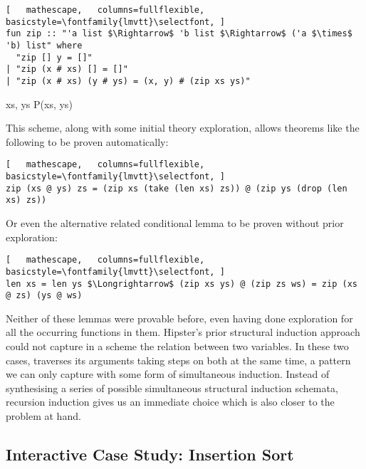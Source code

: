 \begin{lstlisting}[   mathescape,   columns=fullflexible,   basicstyle=\fontfamily{lmvtt}\selectfont, ]
fun zip :: "'a list $\Rightarrow$ 'b list $\Rightarrow$ ('a $\times$ 'b) list" where
  "zip [] y = []"
| "zip (x # xs) [] = []"
| "zip (x # xs) (y # ys) = (x, y) # (zip xs ys)"
\end{lstlisting}

\vspace{2 mm}

  {\forall xs, \; ys \;\; P\;(xs,\; ys)}

\vspace{2 mm}

\noindent This scheme, along with some initial theory exploration, allows theorems like the following to be proven automatically:

\begin{lstlisting}[   mathescape,   columns=fullflexible,   basicstyle=\fontfamily{lmvtt}\selectfont, ]
zip (xs @ ys) zs = (zip xs (take (len xs) zs)) @ (zip ys (drop (len xs) zs))
\end{lstlisting}

\noindent Or even the alternative related conditional lemma to be proven without prior exploration:

\begin{lstlisting}[   mathescape,   columns=fullflexible,   basicstyle=\fontfamily{lmvtt}\selectfont, ]
len xs = len ys $\Longrightarrow$ (zip xs ys) @ (zip zs ws) = zip (xs @ zs) (ys @ ws)
\end{lstlisting}

\noindent Neither of these lemmas were provable before, even having done exploration for all the occurring functions in them.
%
Hipster's prior structural induction approach could not capture in a scheme the relation between two variables.
%
In these two cases,  traverses its arguments taking steps on both at the same time, a pattern we can only capture with some form of simultaneous induction.
%
Instead of synthesising a series of possible simultaneous structural induction schemata, recursion induction gives us an immediate choice which is also closer to the problem at hand.


\subsection{Interactive Case Study: Insertion Sort}

